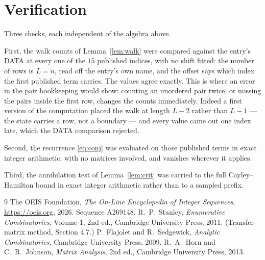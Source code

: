 \documentclass[11pt,a4paper]{article}
\theoremstyle{plain}
\theoremstyle{definition}
\begin{document}
\section{Verification}

Three checks, each independent of the algebra above.

First, the walk counts of Lemma~\ref{lem:walk} were compared against the entry's DATA at
every one of the $15$ published indices, with no shift fitted: the number of rows is
$L=n$, read off the entry's own name, and the offset says which index the first
published term carries. The values agree exactly. This is where an error in the pair
bookkeeping would show: counting an unordered pair twice, or missing the pairs inside the
first row, changes the counts immediately. Indeed a first version of the computation
placed the walk at length $L-2$ rather than $L-1$ --- the state carries a row, not a
boundary --- and every value came out one index late, which the DATA comparison rejected.

Second, the recurrence \eqref{eq:conj} was evaluated on those published terms in exact
integer arithmetic, with no matrices involved, and vanishes wherever it applies.

Third, the annihilation test of Lemma~\ref{lem:crit} was carried to the full
Cayley--Hamilton bound in exact integer arithmetic rather than to a sampled prefix.

\begin{thebibliography}{9}
 The OEIS Foundation, \emph{The On-Line Encyclopedia of Integer
Sequences}, \url{https://oeis.org}, 2026. Sequence A269148.
 R.~P.~Stanley, \emph{Enumerative Combinatorics}, Volume 1, 2nd ed.,
Cambridge University Press, 2011. (Transfer-matrix method, Section 4.7.)
 P.~Flajolet and R.~Sedgewick, \emph{Analytic Combinatorics}, Cambridge
University Press, 2009.
 R.~A.~Horn and C.~R.~Johnson, \emph{Matrix Analysis}, 2nd ed., Cambridge
University Press, 2013.
\end{thebibliography}
\end{document}
